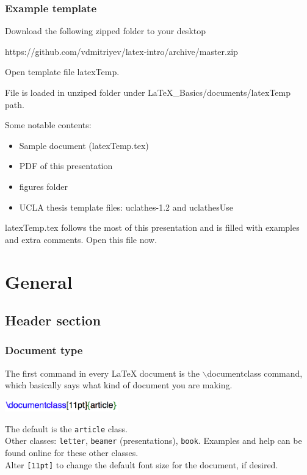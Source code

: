 \documentclass[slidestop,compress,mathserif]{beamer}
\begin{document}
\begin{frame} \frametitle{Example template}
	
Download the following zipped folder to your desktop
\begin{center}
	{\color{highlight} https://github.com/vdmitriyev/latex-intro/archive/master.zip}
\end{center}

Open template file {\color{highlight}latexTemp}. 

File is loaded in unziped folder under {LaTeX\_Basics/documents/latexTemp} path. 

Some notable contents:
\begin{itemize}
	\item Sample document ({\color{highlight}latexTemp.tex})
	\item PDF of this presentation
	\item {\color{highlight}figures} folder
	\item UCLA thesis template files: {\color{highlight}uclathes-1.2} and {\color{highlight}uclathesUse}
\end{itemize}

{\color{highlight}latexTemp.tex} follows the most of this presentation and is filled with examples and extra comments. Open this file now.

\end{frame}



\section[General]{General}

\subsection[Header section]{Header section}
\begin{frame} \frametitle{Document type}
The first command in every LaTeX document is the {\color{command}$\backslash$documentclass} command, which basically says what kind of document you are making.
\begin{center}
\includegraphics[height=0.2in]{basicsOfLatex/general/documentClass}
\end{center}
The default is the \texttt{\color{highlight}article} class.
\vspace{5mm}\\
Other classes: \texttt{\color{highlight}letter}, \texttt{\color{highlight}beamer} (presentations), \texttt{\color{highlight}book}. Examples and help can be found online for these other classes.
\vspace{5mm} \\
Alter \texttt{\color{highlight}[11pt]} to change the default font size for the document, if desired.
\end{frame}
\end{document}
